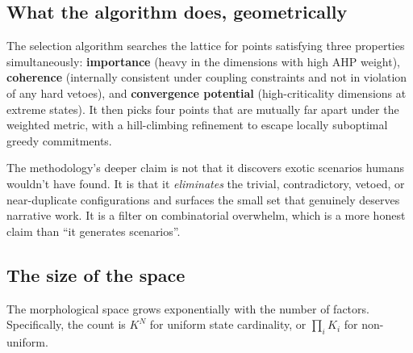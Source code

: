 \documentclass[11pt,a4paper]{article}
\begin{document}
\subsection{What the algorithm does, geometrically}

The selection algorithm searches the lattice for points satisfying three properties simultaneously: \textbf{importance} (heavy in the dimensions with high AHP weight), \textbf{coherence} (internally consistent under coupling constraints and not in violation of any hard vetoes), and \textbf{convergence potential} (high-criticality dimensions at extreme states). It then picks four points that are mutually far apart under the weighted metric, with a hill-climbing refinement to escape locally suboptimal greedy commitments.

The methodology's deeper claim is not that it discovers exotic scenarios humans wouldn't have found. It is that it \emph{eliminates} the trivial, contradictory, vetoed, or near-duplicate configurations and surfaces the small set that genuinely deserves narrative work. It is a filter on combinatorial overwhelm, which is a more honest claim than ``it generates scenarios''.

\subsection{The size of the space}

The morphological space grows exponentially with the number of factors. Specifically, the count is $K^N$ for uniform state cardinality, or $\prod_i K_i$ for non-uniform.
\end{document}
